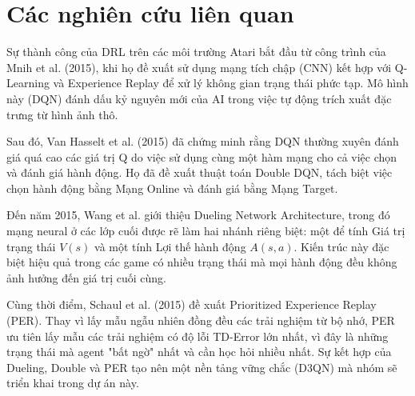 \section{Các nghiên cứu liên quan}

Sự thành công của DRL trên các môi trường Atari bắt đầu từ công trình của Mnih et al. (2015), khi họ đề xuất sử dụng mạng tích chập (CNN) kết hợp với Q-Learning và Experience Replay để xử lý không gian trạng thái phức tạp. Mô hình này (DQN) đánh dấu kỷ nguyên mới của AI trong việc tự động trích xuất đặc trưng từ hình ảnh thô.

Sau đó, Van Hasselt et al. (2015) đã chứng minh rằng DQN thường xuyên đánh giá quá cao các giá trị Q do việc sử dụng cùng một hàm mạng cho cả việc chọn và đánh giá hành động. Họ đã đề xuất thuật toán Double DQN, tách biệt việc chọn hành động bằng Mạng Online và đánh giá bằng Mạng Target.

Đến năm 2015, Wang et al. giới thiệu Dueling Network Architecture, trong đó mạng neural ở các lớp cuối được rẽ làm hai nhánh riêng biệt: một để tính Giá trị trạng thái $V(s)$ và một tính Lợi thế hành động $A(s, a)$. Kiến trúc này đặc biệt hiệu quả trong các game có nhiều trạng thái mà mọi hành động đều không ảnh hưởng đến giá trị cuối cùng.

Cùng thời điểm, Schaul et al. (2015) đề xuất Prioritized Experience Replay (PER). Thay vì lấy mẫu ngẫu nhiên đồng đều các trải nghiệm từ bộ nhớ, PER ưu tiên lấy mẫu các trải nghiệm có độ lỗi TD-Error lớn nhất, vì đây là những trạng thái mà agent "bất ngờ" nhất và cần học hỏi nhiều nhất. Sự kết hợp của Dueling, Double và PER tạo nên một nền tảng vững chắc (D3QN) mà nhóm sẽ triển khai trong dự án này.
